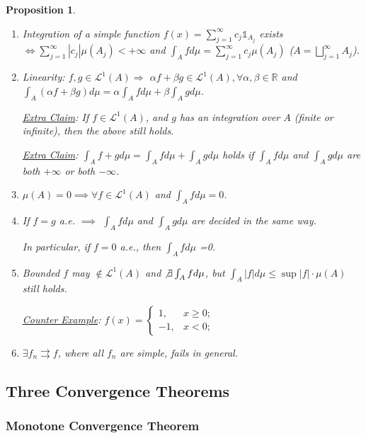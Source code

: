 \documentclass[12pt]{article}
\theoremstyle{blueplain}
\newtheorem{proposition}[theorem]{Proposition}
\theoremstyle{bluedef}
\theoremstyle{blueremark}
\newcommand{\R}{\mathbb{R}}
\numberwithin{equation}{section}
\begin{document}
\begin{proposition}
  \begin{enumerate}
    \item Integration of a simple function $f(x) = \sum_{j=1}^{\infty} c_j \mathds{1}_{A_j}$ exists $\iff \sum_{j=1}^\infty |c_j| \mu(A_j) <+\infty$ and $\int_A fd\mu = \sum_{j=1}^\infty c_j\mu(A_j)$ ($A = \bigsqcup_{j=1}^\infty A_j$).
    \item Linearity: $f,g \in \mathcal{L}^1(A) \Rightarrow$ $\alpha f + \beta g \in \mathcal{L}^1(A), \forall \alpha, \beta \in \R$ and $\int_A (\alpha f + \beta g) d\mu = \alpha \int_A f d\mu + \beta \int_A g d\mu$.

          \underline{Extra Claim}: If $f \in \mathcal{L}^1(A)$, and $g$ has an integration over $A$ (finite or infinite), then the above still holds.

          \underline{Extra Claim}: $\int_A  f + g d\mu = \int_A f d\mu + \int_A g d\mu$ holds if $\int_A  f d\mu$ and $\int_A  g d\mu$ are both $+\infty$ or both $-\infty$.
    \item $\mu(A) = 0 \implies \forall f \in \mathcal{L}^1(A)$ and $\int_A f d\mu = 0$.
    \item If $f = g$ a.e. $\implies$ $\int_A  f d\mu$ and $\int_A  g d\mu$ are decided in the same way.

          In particular, if $f = 0$ a.e., then $\int_A  f d\mu$ =0.
    \item Bounded $f$ may $\not\in \mathcal{L}^1(A)$ and $\not\exists \int_A f d\mu$, but $\int_A |f| d\mu \leq \sup |f| \cdot \mu(A)$ still holds.

          \underline{Counter Example}: $f(x) = \begin{cases} 1, & x \geq 0;\\ -1, & x<0; \end{cases}$
    \item $\exists f_n \rightrightarrows f$, where all $f_n$ are simple, fails in general.




  \end{enumerate}
\end{proposition}

\clearpage

\subsection{Three Convergence Theorems}

\subsubsection{Monotone Convergence Theorem}
\end{document}
